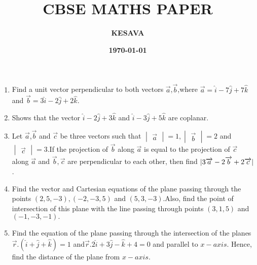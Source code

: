 \documentclass[12pt,-letter paper]{article}
\title{\textbf{CBSE MATHS PAPER}}
\author{\textbf{KESAVA}}
\date{\textbf{\today}}
\DeclarePairedDelimiter\abs{\lvert}{\rvert}
\providecommand{\brak}[1]{\ensuremath{\left(#1\right)}}
\theoremstyle{remark}
\newcommand{\mydet}[1]{\ensuremath{\begin{vmatrix}#1\end{vmatrix}}}
\begin{document}

\begin{enumerate}
\section{Vectors}
  \item Find a unit vector perpendicular to both vectors $\overrightarrow{a}$,$\overrightarrow{b}$,where $\overrightarrow{a}=\hat{i}-7\hat{j}+7\hat{k}$ and $\overrightarrow{b}=3\hat{i}-2\hat{j}+2\hat{k}$.
  \item Shows that the vector $\hat{i}-2\hat{j}+3\hat{k}$ and $\hat{i}-3\hat{j}+5\hat{k}$ are coplanar.
  \item Let  $ \overrightarrow{a}$,$\overrightarrow{b}$ and $\overrightarrow{c}$ be three vectors such that $\mydet{\overrightarrow{a}} = 1, \mydet{\overrightarrow{b}}= 2$ and $\mydet{\overrightarrow{c}}=3$.If the projection of $\overrightarrow {b} $ along $\overrightarrow{a}$ is equal to the projection of $\overrightarrow{c}$ along $ \overrightarrow{a} $ and $\overrightarrow{b},\overrightarrow {c} $ are perpendicular to each other, then find $\abs{3\overrightarrow a-2\overrightarrow b +2\overrightarrow c}$.
		  \item Find the vector and Cartesian equations of the plane passing through the points $\brak{2,5,-3},\brak{-2,-3,5}$ and $\brak{5,3,-3}$.Also, find the point of intersection of this plane with the line passing through points $\brak{3,1,5} $ and $\brak{-1,-3,-1}.$
			  \item Find the equation of the plane passing through the intersection of the planes $\overrightarrow r.\brak{\hat{i}+\hat{j}+\hat{k}}=1 $ and$\overrightarrow  r .2\hat{i}+3\hat{j}-\hat{k}+4=0 $ and parallel to $x-axis$. Hence, find the distance of the plane from $x-axis$.
\end{enumerate}

  
\end{document}
